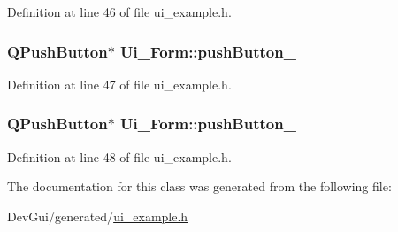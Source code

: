 Definition at line 46 of file ui\_\-example.h.\hypertarget{classUi__Form_2f99ce32d1dcbc708ec777b866145ca7}{
\subsubsection{\setlength{\rightskip}{0pt plus 5cm}QPushButton$\ast$ {\bf Ui\_\-Form::pushButton\_}}}
\label{classUi__Form_2f99ce32d1dcbc708ec777b866145ca7}




Definition at line 47 of file ui\_\-example.h.\hypertarget{classUi__Form_1ed3e40afb137d161c21d75be0cfdb28}{
\subsubsection{\setlength{\rightskip}{0pt plus 5cm}QPushButton$\ast$ {\bf Ui\_\-Form::pushButton\_}}}
\label{classUi__Form_1ed3e40afb137d161c21d75be0cfdb28}




Definition at line 48 of file ui\_\-example.h.

The documentation for this class was generated from the following file:\begin{CompactItemize}
\item 
DevGui/generated/\hyperlink{ui__example_8h}{ui\_\-example.h}\end{CompactItemize}
